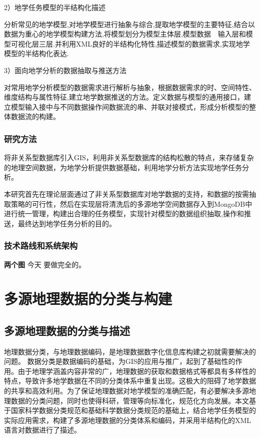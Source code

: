 \documentclass[master]{njnuthesis}
\begin{document}
2）地学任务模型的半结构化描述

分析常见的地学模型,对地学模型进行抽象与综合,提取地学模型的主要特征,结合以数据为重心的地学模型构建方法,将模型划分为模型主体层,模型数据　输入层和模型可视化层三层.并利用XML良好的半结构化特性,描述模型的数据需求,实现地学模型的半结构化表达.

3）面向地学分析的数据抽取与推送方法

对常用地学分析模型的数据需求进行解析与抽象，根据数据需求的时、空间特性、维度结构与属性特征,建立地学数据推送的方法。定义数据与模型的通用接口，建立模型输入接中与不同数据操作间数据流的串、并联对接模式，形成分析模型的整体数据流的构建。

\subsection{研究方法}
将非关系型数据库引入GIS，利用非关系型数据库的结构松散的特点，来存储复杂的地理空间数据，为地学分析提供数据基础，利用地学分析方法实现地学任务分析。

本研究首先在理论层面通过了非关系型数据库对地学数据的支持，和数据的按需抽取策略的可行性，然后在实现层将清洗后的多源地学空间数据存入到MongoDB中进行统一管理，构建出合理的任务模型，实现针对模型的数据组织抽取,操作和推送，最终达到地学任务分析的目的。

\subsection{技术路线和系统架构}
\textbf{两个图} 今天 要做完全的。

\chapter{多源地理数据的分类与构建}
\section{多源地理数据的分类与描述}
地理数据分类，与地理数据编码，是地理数据数字化信息库构建之初就需要解决的问题。
数据分类是数据编码的基础，为GIS的应用与推广，起到了基础性的作用。由于地理学涵盖内容非常的广，地理数据的获取和数据格式等都具有多样性的特点，导致许多地学数据在不同的分类体系中重复出现。这极大的阻碍了地学数据的共享和高效利用。为了保证地理数据对地学模型的准确匹配，有必要解决多源地理数据的分类问题，同时也使得科研，管理等向标准化，规范化方向发展。本文基于国家科学数据分类规范和基础科学数据分类规范的基础上，结合地学任务模型的实际应用需求，构建了多源地理数据的分类体系和编码，并采用半结构化的XML语言对数据进行了描述。
\end{document}
